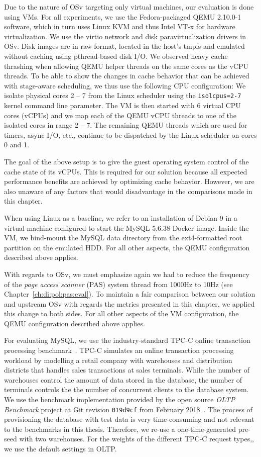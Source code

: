 \documentclass[12pt,a4paper]{book}
\begin{document}
Due to the nature of OSv targeting only virtual machines, our evaluation is done using VMs.
For all experiments, we use the Fedora-packaged QEMU 2.10.0-1 software, which in turn uses Linux KVM and thus Intel VT-x for hardware virtualization.
We use the virtio network and disk paravirtualization drivers in OSv.
Disk images are in raw format, located in the host's tmpfs and emulated without caching using pthread-based disk I/O.
We observed heavy cache thrashing when allowing QEMU helper threads on the same cores as the vCPU threads.
To be able to show the changes in cache behavior that can be achieved with stage-aware scheduling, we thus use the following CPU configuration:
We isolate physical cores 2 -- 7 from the Linux scheduler using the \lstinline[style=figurecpp]{isolcpus=2-7} kernel command line parameter.
The VM is then started with 6 virtual CPU cores (vCPUs) and we map each of the QEMU vCPU threads to one of the isolated cores in range 2 -- 7.
The remaining QEMU threads which are used for timers, async-I/O, etc., continue to be dispatched by the Linux scheduler on cores 0 and 1.

The goal of the above setup is to give the guest operating system control of the cache state of its vCPUs.
This is required for our solution because all expected performance benefits are achieved by optimizing cache behavior.
However, we are also unaware of any factors that would disadvantage in the comparisons made in this chapter.

When using Linux as a baseline, we refer to an installation of Debian 9 in a virtual machine configured to start the MySQL 5.6.38 Docker image.
Inside the VM, we bind-mount the MySQL data directory from the ext4-formatted root partition on the emulated HDD.
For all other aspects, the QEMU configuration described above applies.

With regards to OSv, we must emphasize again we had to reduce the frequency of the \emph{page access scanner} (PAS) system thread from 1000Hz to 10Hz (see Chapter~\ref{ch:di:pol:pas:eval}).
To maintain a fair comparison between our solution and upstream OSv with regards the metrics presented in this chapter, we applied this change to both sides.
For all other aspects of the VM configuration, the QEMU configuration described above applies.

For evaluating MySQL, we use the industry-standard TPC-C online transaction processing benchmark~\cite{tpccSpec}.
TPC-C simulates an online transaction processing workload by modelling a retail company with warehouses and distribution districts that handles sales transactions at sales terminals.
While the number of warehouses control the amount of data stored in the database, the number of terminals controls the the number of concurrent clients to the database system.
We use the benchmark implementation provided by the open source \emph{OLTP Benchmark} project at Git revision \texttt{019d9cf} from February 2018~\cite{oltpbench}.
The process of provisioning the database with test data is very time-consuming and not relevant to the benchmarks in this thesis.
Therefore, we re-use a one-time-generated pre-seed with two warehouses.
For the weights of the different TPC-C request types,, we use the default settings in OLTP.
\end{document}

